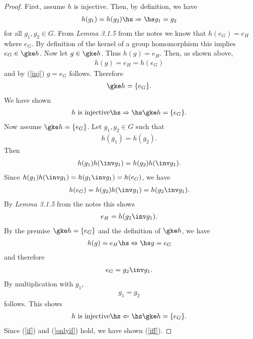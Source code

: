 \documentclass{article}
\begin{document}
\begin{proof}
    First, assume $h$ is injective. Then, by definition, we have
    \begin{align}
        \label{inj}
        h(g_1)=h(g_2) \hs\Rightarrow\hs g_1 = g_2
    \end{align}
    for all $g_1,g_2\in G$. From \emph{Lemma 3.1.5} from the notes
    we know that $h(e_G) = e_H$ where $e_G$. By definition of the kernel of
    a group homomorphism this implies $e_G\in\gke h$. Now let
    $g\in\gke h$. Thus $h(g) = e_H$. Then, as shown above,
    \begin{align*}
        h(g) = e_H = h(e_G)
    \end{align*}
    and by (\ref{inj}) $g=e_G$ follows. Therefore
    \begin{align*}
        \gke h = \{e_G\}.
    \end{align*}
    We have shown
    \begin{align}
        \label{if}
        h\text{ is injective}\hs\Rightarrow\hs \gke h = \{e_G\}.
    \end{align}
    Now assume $\gke h = \{e_G\}$. Let $g_1,g_2\in G$ such that
    \begin{align*}
        h(g_1) = h(g_2).
    \end{align*}
    Then
    \begin{align*}
        h(g_1)h(\inv g_1) = h(g_2)h(\inv g_1).
    \end{align*}
    Since $h(g_1)h(\inv g_1) = h(g_1\inv g_1) = h(e_G)$, we have
    \begin{align*}
        h(e_G) = h(g_2)h(\inv g_1)= h(g_2\inv g_1).
    \end{align*}
    By \emph{Lemma 3.1.5} from the notes this shows
    \begin{align*}
        e_H = h(g_2\inv g_1).
    \end{align*}
    By the premise $\gke h = \{e_G\}$ and the definition of $\gke h$,
    we have
    \begin{align*}
        h(g) = e_H \hs\Leftrightarrow\hs g=e_G
    \end{align*}
    and therefore
    \begin{align*}
        e_G = g_2\inv g_1.
    \end{align*}
    By multiplication with $g_1$,
    \begin{align*}
        g_1 = g_2
    \end{align*}
    follows. This shows
    \begin{align}
        \label{onlyif}
        h\text{ is injective}\hs\Leftarrow\hs \gke h = \{e_G\}.
    \end{align}
    Since (\ref{if}) and (\ref{onlyif}) hold, we have shown (\ref{iff}).
\end{proof}
\end{document}
